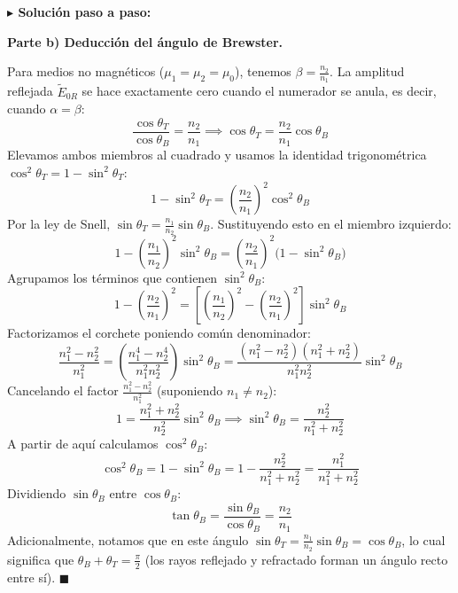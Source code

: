 \documentclass[11pt,a4paper]{book}
\newenvironment{solucion}{%
    \par\medskip\noindent\textbf{\color{blue!65!black}\Large $\blacktriangleright$ Solución paso a paso:}\par\medskip
}{%
    \hfill$\blacksquare$\par\bigskip
}
\begin{document}
\begin{solucion}
\medskip
\textbf{Parte b) Deducción del ángulo de Brewster.}

Para medios no magnéticos ($\mu_1 = \mu_2 = \mu_0$), tenemos $\beta = \frac{n_2}{n_1}$. La amplitud reflejada $\tilde{E}_{0R}$ se hace exactamente cero cuando el numerador se anula, es decir, cuando $\alpha = \beta$:
\begin{equation}
    \frac{\cos\theta_T}{\cos\theta_B} = \frac{n_2}{n_1} \implies \cos\theta_T = \frac{n_2}{n_1}\cos\theta_B
\end{equation}
Elevamos ambos miembros al cuadrado y usamos la identidad trigonométrica $\cos^2\theta_T = 1 - \sin^2\theta_T$:
\begin{equation}
    1 - \sin^2\theta_T = \left(\frac{n_2}{n_1}\right)^2 \cos^2\theta_B
\end{equation}
Por la ley de Snell, $\sin\theta_T = \frac{n_1}{n_2}\sin\theta_B$. Sustituyendo esto en el miembro izquierdo:
\begin{equation}
    1 - \left(\frac{n_1}{n_2}\right)^2 \sin^2\theta_B = \left(\frac{n_2}{n_1}\right)^2 \big(1 - \sin^2\theta_B\big)
\end{equation}
Agrupamos los términos que contienen $\sin^2\theta_B$:
\begin{equation}
    1 - \left(\frac{n_2}{n_1}\right)^2 = \left[ \left(\frac{n_1}{n_2}\right)^2 - \left(\frac{n_2}{n_1}\right)^2 \right] \sin^2\theta_B
\end{equation}
Factorizamos el corchete poniendo común denominador:
\begin{equation}
    \frac{n_1^2 - n_2^2}{n_1^2} = \left( \frac{n_1^4 - n_2^4}{n_1^2 n_2^2} \right) \sin^2\theta_B = \frac{(n_1^2 - n_2^2)(n_1^2 + n_2^2)}{n_1^2 n_2^2} \sin^2\theta_B
\end{equation}
Cancelando el factor $\frac{n_1^2 - n_2^2}{n_1^2}$ (suponiendo $n_1 \neq n_2$):
\begin{equation}
    1 = \frac{n_1^2 + n_2^2}{n_2^2} \sin^2\theta_B \implies \sin^2\theta_B = \frac{n_2^2}{n_1^2 + n_2^2}
\end{equation}
A partir de aquí calculamos $\cos^2\theta_B$:
\begin{equation}
    \cos^2\theta_B = 1 - \sin^2\theta_B = 1 - \frac{n_2^2}{n_1^2 + n_2^2} = \frac{n_1^2}{n_1^2 + n_2^2}
\end{equation}
Dividiendo $\sin\theta_B$ entre $\cos\theta_B$:
\begin{equation}
    \tan\theta_B = \frac{\sin\theta_B}{\cos\theta_B} = \frac{n_2}{n_1}
\end{equation}
Adicionalmente, notamos que en este ángulo $\sin\theta_T = \frac{n_1}{n_2}\sin\theta_B = \cos\theta_B$, lo cual significa que $\theta_B + \theta_T = \frac{\pi}{2}$ (los rayos reflejado y refractado forman un ángulo recto entre sí).
\end{solucion}
\end{document}
